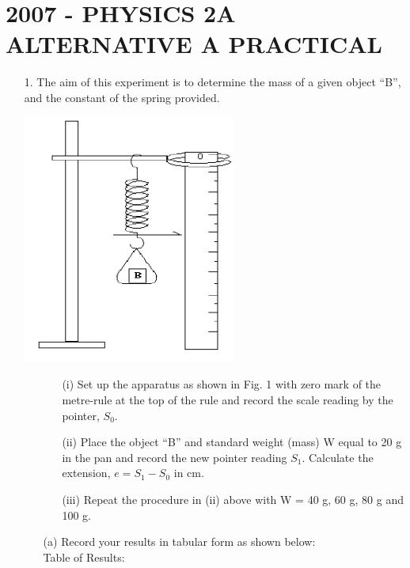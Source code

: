 \section{2007 - PHYSICS 2A ALTERNATIVE A PRACTICAL}

\begin{enumerate}
\item[1.] The aim of this experiment is to determine the mass of a given object ``B'', and the constant of the spring provided.

\begin{center}
\includegraphics[width=7cm]{./img/2007-1-alt.png}
\end{center}

\begin{itemize}
\item[]
\begin{itemize}
\item[(i)] Set up the apparatus as shown in Fig. 1 with zero mark of the metre-rule at the top of the rule and record the scale reading by the pointer, $S_0$.
\item[(ii)] Place the object ``B'' and standard weight (mass) W equal to 20 g in the pan and record the new pointer reading $S_1$. Calculate the extension, $e = S_1 - S_0$ in cm.
\item[(iii)] Repeat the procedure in (ii) above with W = 40 g, 60 g, 80 g and 100 g.
\end{itemize}
\item[(a)] Record your results in tabular form as shown below:\\
Table of Results:


\end{itemize}
\end{enumerate}
